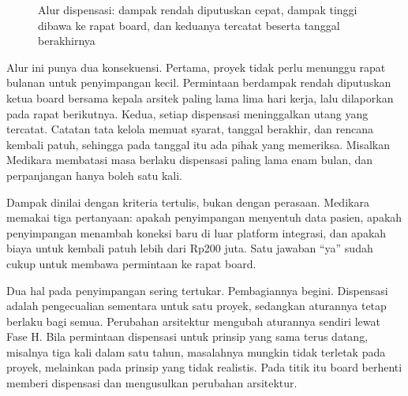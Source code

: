 \begin{figure}[!htb]
  \centering
  
  \caption{Alur dispensasi: dampak rendah diputuskan cepat, dampak tinggi
           dibawa ke rapat board, dan keduanya tercatat beserta tanggal
           berakhirnya}
  \label{fig:ch14-alur-dispensasi}
\end{figure}

Alur ini punya dua konsekuensi. Pertama, proyek tidak perlu menunggu rapat
bulanan untuk penyimpangan kecil. Permintaan berdampak rendah diputuskan
ketua board bersama kepala arsitek paling lama lima hari kerja, lalu
dilaporkan pada rapat berikutnya. Kedua, setiap dispensasi meninggalkan
utang yang tercatat. Catatan tata kelola memuat syarat, tanggal berakhir,
dan rencana kembali patuh, sehingga pada tanggal itu ada pihak yang
memeriksa. Misalkan Medikara membatasi masa berlaku dispensasi paling lama
enam bulan, dan perpanjangan hanya boleh satu kali.

Dampak dinilai dengan kriteria tertulis, bukan dengan perasaan. Medikara
memakai tiga pertanyaan: apakah penyimpangan menyentuh data pasien, apakah
penyimpangan menambah koneksi baru di luar platform integrasi, dan apakah
biaya untuk kembali patuh lebih dari Rp200 juta. Satu jawaban ``ya'' sudah
cukup untuk membawa permintaan ke rapat board.

Dua hal pada penyimpangan sering tertukar. Pembagiannya begini. Dispensasi
adalah pengecualian sementara untuk satu proyek, sedangkan aturannya tetap
berlaku bagi semua. Perubahan arsitektur mengubah aturannya sendiri lewat
Fase H. Bila permintaan dispensasi untuk prinsip yang sama terus datang,
misalnya tiga kali dalam satu tahun, masalahnya mungkin tidak terletak pada
proyek, melainkan pada prinsip yang tidak realistis. Pada titik itu board
berhenti memberi dispensasi dan mengusulkan perubahan arsitektur.

